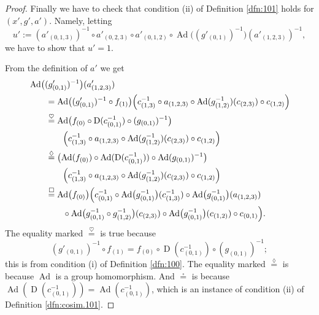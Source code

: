 \documentclass[a4paper,10pt]{amsart}
\theoremstyle{definition}
\numberwithin{equation}{section}
\newcommand{\opn}{\operatorname}
\begin{document}
\begin{proof}
Finally we have to check that condition (ii) of Definition \ref{dfn:101} holds
for $(x', g', a')$. Namely, letting 
\begin{equation}
u' := 
(a'_{(0, 1, 3)})^{-1} \circ a'_{(0, 2, 3)} \circ a'_{(0, 1, 2)} \circ
\opn{Ad} \bigl( (g'_{(0, 1)})^{-1} \bigr) (a'_{(1, 2, 3)})^{-1} ,
\end{equation}
we have to show that $u' = 1$.

{}From the definition of $a'$ we get
\begin{equation} \label{eqn:102}
\begin{aligned}
& \opn{Ad} \bigl( (g'_{(0, 1)})^{-1} \bigr) (a'_{(1, 2, 3)}) 
\\ 
& \qquad = \opn{Ad} \bigl( (g'_{(0, 1)})^{-1} \circ f_{(1)} \bigr)
\Bigl( c_{(1, 3)}^{-1} \circ a_{(1, 2, 3)} \circ
\opn{Ad}(g_{(1, 2)}^{-1})(c_{(2, 3)}) \circ c_{(1, 2)} \Bigr)
\\
& \qquad \overset{\heartsuit}{=} \opn{Ad} \bigl( f_{(0)} 
\circ \opn{D}(c_{(0, 1)}^{-1}) \circ (g_{(0, 1)})^{-1} \bigr)
\\
& \qquad  \qquad
\Bigl( c_{(1, 3)}^{-1} \circ a_{(1, 2, 3)} \circ
\opn{Ad}(g_{(1, 2)}^{-1})(c_{(2, 3)}) \circ c_{(1, 2)}  \Bigr)
\\
& \qquad \overset{\lozenge}{=}  
\bigl( \opn{Ad} (f_{(0)}) \circ \opn{Ad}(\opn{D}(c_{(0, 1)}^{-1})) 
\circ \opn{Ad}(g_{(0, 1)})^{-1} \bigr) 
\\
& \qquad  \qquad
\Bigl( c_{(1, 3)}^{-1} \circ a_{(1, 2, 3)} \circ
\opn{Ad}(g_{(1, 2)}^{-1})(c_{(2, 3)}) \circ c_{(1, 2)} \Bigr)
\\
& \qquad \overset{\square}{=} \opn{Ad} \bigl( f_{(0)} \bigr)
\Bigl( c_{(0, 1)}^{-1} \circ 
\opn{Ad} \bigl( g_{(0, 1)}^{-1} \bigr)(c_{(1, 3)}^{-1}) \circ
\opn{Ad} \bigl( g_{(0, 1)}^{-1} \bigr)(a_{(1, 2, 3)}) 
\\
& \qquad \qquad \circ
\opn{Ad} \bigl( g_{(0, 1)}^{-1} \circ g_{(1, 2)}^{-1} \bigr)(c_{(2, 3)}) \circ
\opn{Ad} \bigl( g_{(0, 1)}^{-1} \bigr)(c_{(1, 2)}) 
\circ c_{(0, 1)} \Bigr) .
\end{aligned}
\end{equation}
The equality marked $\overset{\heartsuit}{=}$ is true because
\[  (g'_{(0, 1)})^{-1} \circ f_{(1)} = f_{(0)} \circ \opn{D}(c_{(0, 1)}^{-1})
\circ (g_{(0, 1)})^{-1} ; \]
this is from condition (i) of Definition \ref{dfn:100}.
The equality marked $\overset{\lozenge}{=}$ is because $\opn{Ad}$ is a group
homomorphism. And $\overset{\square}{=}$ is because 
$\opn{Ad}(\opn{D}(c_{(0, 1)}^{-1})) = \opn{Ad}(c_{(0, 1)}^{-1})$, 
which is an instance of condition (ii) of Definition \ref{dfn:cosim.101}.


\end{proof}
\end{document}
